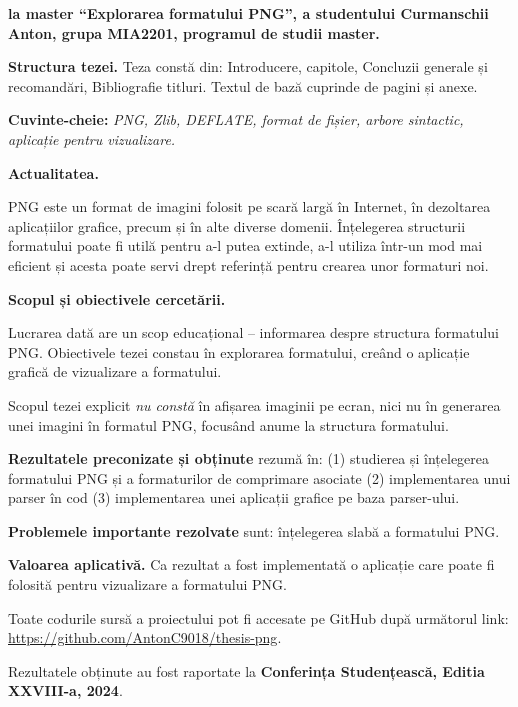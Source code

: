 \documentclass[a4paper,12pt]{report}
\newcommand{\uniGroupName}{MIA2201}
\newcommand{\authorName}{Curmanschii Anton} %
\newcommand{\thesisTitle}{Explorarea formatului PNG}
\newcommand{\thesisType}{master} %
\newcommand{\programulDeStudii}{master} %
\renewcommand{\year}{2024}
\newcommand{\conferencesList}{Conferința Studențească, Editia XXVIII-a, \year}
\newcommand{\github}{\url{https://github.com/AntonC9018/thesis-png}}
\begin{document}
\titlePage

\clearpage
\tableofcontents

\clearpage
{}

\textbf{la \thesisType{} ``\thesisTitle{}'', a studentului \authorName{}, grupa \uniGroupName{}, programul de studii \programulDeStudii.}

\textbf{Structura tezei.}
Teza constă din: Introducere, \chapterCount{} capitole, Concluzii generale și recomandări, Bibliografie \bibliographyEntryCount{} titluri.
Textul de bază cuprinde \usefulPageCount{} de pagini și \anexeCount{} anexe.

\textbf{Cuvinte-cheie:}
\textit{\acs{PNG}, Zlib, DEFLATE, format de fișier, arbore sintactic, aplicație pentru vizualizare.}

\textbf{Actualitatea.}

\acs{PNG} este un format de imagini folosit pe scară largă în Internet,
în dezoltarea aplicațiilor grafice, precum și în alte diverse domenii.
Înțelegerea structurii formatului poate fi utilă pentru a-l putea extinde, 
a-l utiliza într-un mod mai eficient și acesta poate servi drept referință pentru 
crearea unor formaturi noi.

\textbf{Scopul și obiectivele cercetării.}

Lucrarea dată are un scop educațional -- informarea despre structura formatului \acs{PNG}.
Obiectivele tezei constau în explorarea formatului, creând o aplicație grafică de vizualizare a formatului.

Scopul tezei explicit \textit{nu constă} în afișarea imaginii pe ecran,
nici nu în generarea unei imagini în formatul PNG,
focusând anume la structura formatului.

\textbf{Rezultatele preconizate și obținute} rezumă în: 
(1) studierea și înțelegerea formatului \acs{PNG} și a formaturilor de comprimare asociate 
(2) implementarea unui parser în cod
(3) implementarea unei aplicații grafice pe baza parser-ului.

\textbf{Problemele importante rezolvate} sunt: înțelegerea slabă a formatului \acs{PNG}.

\textbf{Valoarea aplicativă.} Ca rezultat a fost implementată o aplicație care poate fi folosită pentru vizualizare a formatului \acs{PNG}.

Toate codurile sursă a proiectului pot fi accesate pe GitHub după următorul link: \github.

Rezultatele obținute au fost raportate la \textbf{\conferencesList}\cite{self}.
\end{document}
